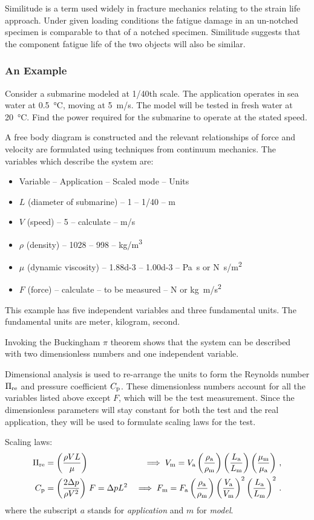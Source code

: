 Similitude is a term used widely in fracture mechanics relating to the strain life approach. Under given loading conditions the fatigue damage in an un-notched specimen is comparable to that of a notched specimen. Similitude suggests that the component fatigue life of the two objects will also be similar.


\subsubsection{An Example}
Consider a submarine modeled at 1/40th scale. The application operates in sea water at \SI{0.5}{\celsius}, moving at \SI{5}{m/s}. The model will be tested in fresh water at \SI{20}{\celsius}. Find the power required for the submarine to operate at the stated speed.

A free body diagram is constructed and the relevant relationships of force and velocity are formulated using techniques from continuum mechanics. The variables which describe the system are:
\begin{itemize}
\item Variable -- Application -- Scaled mode -- Units
\item $L$ (diameter of submarine) -- 1 -- 1/40 -- \si{m}
\item $V$ (speed) -- 5 -- calculate -- \si{m/s}
\item $\rho$ (density) -- 1028 -- 998 -- \si{kg/m^3}
\item $\mu$ (dynamic viscosity) -- \num{1.88d-3} -- \num{1.00d-3} -- \si{Pa.s} or \si{N.s/m^2}
\item $F$ (force) -- calculate -- to be measured -- \si{N} or \si{kg.m/s^2}
\end{itemize}

This example has five independent variables and three fundamental units. The fundamental units are meter, kilogram, second.

Invoking the Buckingham $\pi$ theorem shows that the system can be described with two dimensionless numbers and one independent variable.

Dimensional analysis is used to re-arrange the units to form the Reynolds number $\Pi_\text{re}$ and pressure coefficient $C_\text{p}$. These dimensionless numbers account for all the variables listed above except $F$, which will be the test measurement. Since the dimensionless parameters will stay constant for both the test and the real application, they will be used to formulate scaling laws for the test.

Scaling laws:
\begin{align*}
\rey &= \left(\dfrac{\rho V L}{\mu}\right) &\implies 
    V\txt m = V\txt a\left(\dfrac{\rho\txt a}{\rho\txt m}\right)\left(\dfrac{L\txt a}{L\txt m}\right)
              \left(\dfrac{\mu\txt m}{\mu\txt a}\right)\,,\\
%
C\txt p &= \left(\dfrac{2\diff p}{\rho V^2}\right)\,F = \diff pL^2 &\implies 
    F\txt m = F\txt a\left(\dfrac{\rho\txt a}{\rho\txt m}\right)\left(\dfrac{V\txt a}{V\txt m}\right)^2
              \left(\dfrac{L\txt a}{L\txt m}\right)^2\,.
\end{align*}
where the subscript $a$ stands for \emph{application} and $m$ for \emph{model}.

